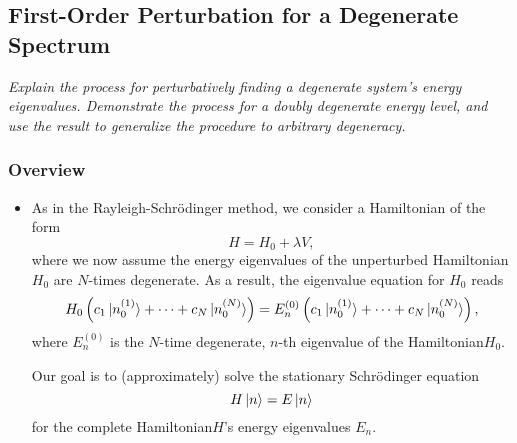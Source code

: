 \documentclass[11pt, a4paper]{article}
\newcommand{\Schro}{Schr\"{o}dinger\xspace}
\newcommand{\Ham}{Hamiltonian\xspace}
\begin{document}
\subsection{First-Order Perturbation for a Degenerate Spectrum}
\textit{Explain the process for perturbatively finding a degenerate system's energy eigenvalues. Demonstrate the process for a doubly degenerate energy level, and use the result to generalize the procedure to arbitrary degeneracy.}

\subsubsection{Overview}
\begin{itemize}
    \item As in the Rayleigh-\Schro method, we consider a \Ham of the form
    \begin{equation*}
        H = H_{0} + \lambda V,
    \end{equation*}
    where we now assume the energy eigenvalues of the unperturbed \Ham $ H_{0} $ are $ N $-times degenerate. As a result, the eigenvalue equation for $ H_{0} $ reads
    \begin{equation*}
        H_{0} \left( c_{1}\ket*{n_{0}^{(1)}} + \cdots + c_{N}\ket*{n_{0}^{(N)}}\right) = E_{n}^{(0)} \left( c_{1}\ket*{n_{0}^{(1)}} + \cdots + c_{N}\ket*{n_{0}^{(N)}}\right),
    \end{equation*}
    where $ E_{n}^{(0)} $ is the $ N $-time degenerate, $ n $-th eigenvalue of the \Ham $ H_{0} $.

    Our goal is to (approximately) solve the stationary \Schro equation
    \begin{equation*}
        H \ket{n} = E \ket{n}
    \end{equation*}
    for the complete \Ham $ H $'s energy eigenvalues $ E_{n} $. 


\end{itemize}
\end{document}
